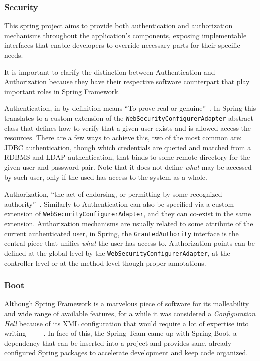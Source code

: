 \subsubsection{Security}
This spring project aims to provide both authentication and authorization mechanisms throughout the application's components, exposing implementable interfaces that enable developers to override necessary parts for their specific needs.

It is important to clarify the distinction between Authentication and Authorization because they have their respective software counterpart that play important roles in Spring Framework.

Authentication, in by definition means ``To prove real or genuine''~\cite{merriamwebster}. In Spring this translates to a custom extension of the \texttt{WebSecurityConfigurerAdapter} abstract class that defines how to verify that a given user exists and is allowed access the resources. There are a few ways to achieve this, two of the most common are: \gls{JDBC} authentication, though which credentials are queried and matched from a \gls{RDBMS} and \gls{LDAP} authentication, that binds to some remote directory for the given user and password pair. Note that it does not define \textit{what} may be accessed by such user, only if the used has access to the system as a whole.

Authorization, ``the act of endorsing, or permitting by some recognized authority''~\cite{merriamwebster}. Similarly to Authentication can also be specified via a custom extension of \texttt{WebSecurityConfigurerAdapter}, and they can co-exist in the same extension. Authorization mechanisms are usually related to some attribute of the current authenticated user, in Spring, the \texttt{GrantedAuthority} interface is the central piece that unifies \textit{what} the user has access to. Authorization points can be defined at the global level by the \texttt{WebSecurityConfigurerAdapter}, at the controller level or at the method level though proper annotations.

\subsubsection{Boot}
Although Spring Framework is a marvelous piece of software for its malleability and wide range of available features, for a while it was considered a \textit{Configuration Hell} because of its \gls{XML} configuration that would require a lot of expertise into writing~\cite{xmlhell1}~\cite{xmlhell2}~\cite{xmlhell3}~\cite{xmlhell4}~\cite{xmlhell5}. In face of this, the Spring Team came up with Spring Boot, a dependency that can be inserted into a project and provides sane, already-configured Spring packages to accelerate development and keep code organized.

